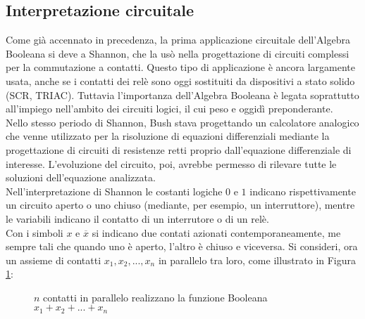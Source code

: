 \documentclass[a4paper]{extarticle}
\begin{document}
\vspace{1em}
\subsection{Interpretazione circuitale}
Come già accennato in precedenza, la prima applicazione circuitale dell’Algebra Booleana si deve a Shannon, che la usò nella progettazione di circuiti complessi per la commutazione a contatti. Questo tipo di applicazione è ancora largamente usata, anche se i contatti dei relè sono oggi sostituiti da dispositivi a stato solido (SCR, TRIAC). Tuttavia l’importanza dell’Algebra Booleana è legata soprattutto all’impiego nell’ambito dei circuiti logici, il cui peso e oggidì preponderante.\\
Nello stesso periodo di Shannon, Bush stava progettando un calcolatore analogico che venne utilizzato per la risoluzione di equazioni differenziali mediante la progettazione di circuiti di resistenze retti proprio dall'equazione differenziale di interesse. L'evoluzione del circuito, poi, avrebbe permesso di rilevare tutte le soluzioni dell'equazione analizzata.\\
Nell'interpretazione di Shannon le costanti logiche \(0\) e \(1\) indicano rispettivamente un circuito aperto o uno chiuso (mediante, per esempio, un interruttore), mentre le variabili indicano il contatto di un interrutore o di un relè.\\
Con i simboli \(x\) e \(\overline{x}\) si indicano due contati azionati contemporaneamente, me sempre tali che quando uno è aperto, l'altro è chiuso e viceversa. Si consideri, ora un assieme di contatti \(x_1, x_2, ..., x_n\) in parallelo tra loro, come illustrato in Figura \ref{fig:contatti_parallelo}:

\begin{figure}[H]
    \centering
    \caption{$n$ contatti in parallelo realizzano la funzione Booleana \(x_1 + x_2 + ... + x_n\)}
    \label{fig:contatti_parallelo}
\end{figure}
\end{document}
